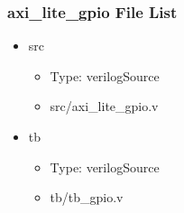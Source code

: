 \subsubsection{axi\_lite\_gpio File List}
\begin{itemize}
\item src
	\begin{itemize}
	\item[$\space$] Type: verilogSource
	\item src/axi\_lite\_gpio.v
	\end{itemize}
\item tb
	\begin{itemize}
	\item[$\space$] Type: verilogSource
	\item tb/tb\_gpio.v
	\end{itemize}
\end{itemize}
